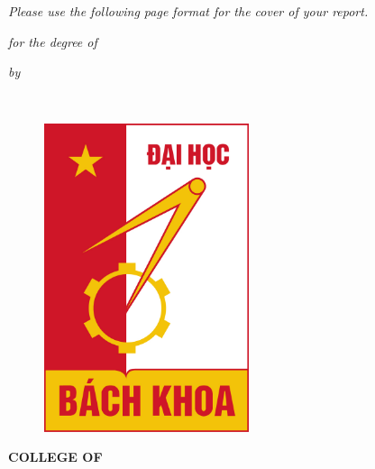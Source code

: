 \thispagestyle{empty}
\begin{center}
\vspace*{\fill}
{\textit{Please use the following page format for the cover of your report.}}
\vspace*{\fill} 
\end{center}
\newpage
\thispagestyle{empty}
\begin{center}
    { \huge {\bfseries {\ReportTitle}} \par}
\vspace{4\baselineskip}
    {\textit{\RoportType for the degree of} \par}
\vspace{4\baselineskip}
    {\large \bf \Degree \par} 
\vspace{\baselineskip}
    {\textit{by} \par}
\vspace{\baselineskip}
    {{\large {\bf \firstAuthor \\ \firstAuthorID}} \par}
\vspace{4\baselineskip}
    {\begin{figure}[!h] 
	\centering
	\includegraphics[width=60mm]{./Images/logo/bkhn} 
     \end{figure}
    }
\vspace{1.5\baselineskip}
    {\bf \MakeUppercase{College of \College} \par}
\vspace*{1ex}
    {\bf \MakeUppercase{\University} \par}
\vspace*{5ex}
    {\bf \MakeUppercase{\reportSubmissionTerm} \par}    
    
 \end{center}
 
 
